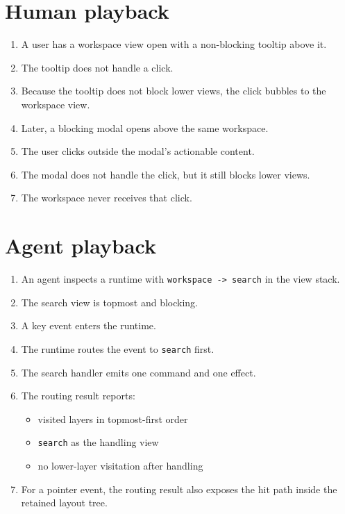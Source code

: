 \section{Human playback}\label{record-152-human-playback}

\begin{enumerate}
\def\labelenumi{\arabic{enumi}.}
\tightlist
\item
  A user has a workspace view open with a non-blocking tooltip above it.
\item
  The tooltip does not handle a click.
\item
  Because the tooltip does not block lower views, the click bubbles to the workspace view.
\item
  Later, a blocking modal opens above the same workspace.
\item
  The user clicks outside the modal's actionable content.
\item
  The modal does not handle the click, but it still blocks lower views.
\item
  The workspace never receives that click.
\end{enumerate}

\section{Agent playback}\label{record-152-agent-playback}

\begin{enumerate}
\def\labelenumi{\arabic{enumi}.}
\tightlist
\item
  An agent inspects a runtime with \texttt{w\allowbreak{}o\allowbreak{}r\allowbreak{}k\allowbreak{}s\allowbreak{}p\allowbreak{}a\allowbreak{}c\allowbreak{}e\allowbreak{} \allowbreak{}-\allowbreak{}>\allowbreak{} \allowbreak{}s\allowbreak{}e\allowbreak{}a\allowbreak{}r\allowbreak{}c\allowbreak{}h} in the view stack.
\item
  The search view is topmost and blocking.
\item
  A key event enters the runtime.
\item
  The runtime routes the event to \texttt{s\allowbreak{}e\allowbreak{}a\allowbreak{}r\allowbreak{}c\allowbreak{}h} first.
\item
  The search handler emits one command and one effect.
\item
  The routing result reports:

  \begin{itemize}
  \tightlist
  \item
    visited layers in topmost-first order
  \item
    \texttt{s\allowbreak{}e\allowbreak{}a\allowbreak{}r\allowbreak{}c\allowbreak{}h} as the handling view
  \item
    no lower-layer visitation after handling
  \end{itemize}
\item
  For a pointer event, the routing result also exposes the hit path inside the retained layout tree.
\end{enumerate}

